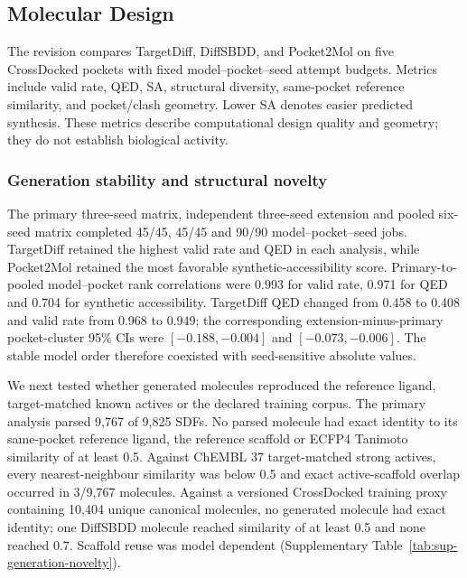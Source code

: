 \documentclass{article}
\begin{document}
\subsection{Molecular Design}

The revision compares TargetDiff, DiffSBDD, and Pocket2Mol on five CrossDocked pockets with fixed model--pocket--seed attempt budgets. Metrics include valid rate, QED, SA, structural diversity, same-pocket reference similarity, and pocket/clash geometry. Lower SA denotes easier predicted synthesis. These metrics describe computational design quality and geometry; they do not establish biological activity.

\subsubsection{Generation stability and structural novelty}

The primary three-seed matrix, independent three-seed extension and pooled six-seed matrix completed 45/45, 45/45 and 90/90 model--pocket--seed jobs. TargetDiff retained the highest valid rate and QED in each analysis, while Pocket2Mol retained the most favorable synthetic-accessibility score. Primary-to-pooled model--pocket rank correlations were 0.993 for valid rate, 0.971 for QED and 0.704 for synthetic accessibility. TargetDiff QED changed from 0.458 to 0.408 and valid rate from 0.968 to 0.949; the corresponding extension-minus-primary pocket-cluster 95\% CIs were $[-0.188,-0.004]$ and $[-0.073,-0.006]$. The stable model order therefore coexisted with seed-sensitive absolute values.

We next tested whether generated molecules reproduced the reference ligand, target-matched known actives or the declared training corpus. The primary analysis parsed 9,767 of 9,825 SDFs. No parsed molecule had exact identity to its same-pocket reference ligand, the reference scaffold or ECFP4 Tanimoto similarity of at least 0.5. Against ChEMBL 37 target-matched strong actives, every nearest-neighbour similarity was below 0.5 and exact active-scaffold overlap occurred in 3/9,767 molecules. Against a versioned CrossDocked training proxy containing 10,404 unique canonical molecules, no generated molecule had exact identity; one DiffSBDD molecule reached similarity of at least 0.5 and none reached 0.7. Scaffold reuse was model dependent (Supplementary Table~\ref{tab:sup-generation-novelty}).
\end{document}
